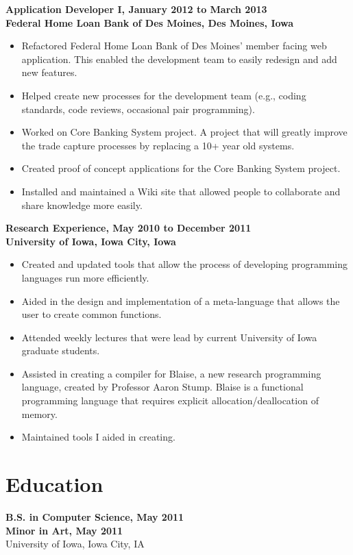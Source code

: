 \documentclass[margin]{res}
\begin{document}
\begin{resume}
 {\bf  Application Developer I, January 2012 to March 2013\\
   Federal Home Loan Bank of Des Moines, Des Moines, Iowa}
 \begin{itemize} \itemsep -2pt
 \item Refactored Federal Home Loan Bank of Des Moines' member facing web application. This enabled the development team to easily redesign and add new features.
 \item Helped create new processes for the development team (e.g., coding standards, code reviews, occasional pair programming). 
 \item Worked on Core Banking System project. A project that will greatly improve the trade capture processes by replacing a 10+ year old systems.
 \item Created proof of concept applications for the Core Banking System project.
 \item Installed and maintained a Wiki site that allowed people to collaborate and share knowledge more easily.
 \end{itemize}
  
{\bf  Research Experience, May 2010 to December 2011\\
 University of Iowa, Iowa City, Iowa}
 \begin{itemize} \itemsep -2pt
 \item Created and updated tools that allow the process of developing programming languages run more efficiently.
 \item Aided in the design and implementation of a meta-language that allows the user to create common functions.
 \item Attended weekly lectures that were lead by current University of Iowa graduate students.
 \item Assisted in creating a compiler for Blaise, a new research programming language, created by Professor Aaron Stump. Blaise is a functional programming language that requires explicit allocation/deallocation of memory.
 \item Maintained tools I aided in creating.
 \end{itemize}

 \section{Education} 
{\bf B.S. in Computer Science, May 2011\\
Minor in Art, May 2011}\\
University of Iowa, Iowa City, IA


\end{resume}
\end{document}
